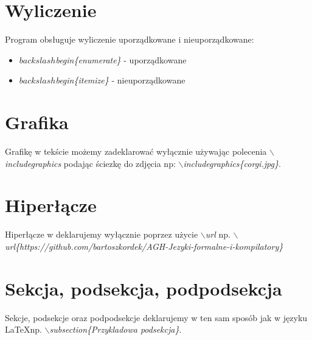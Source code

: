 \section{Wyliczenie}

Program obsługuje wyliczenie uporządkowane i nieuporządkowane:
\begin{itemize}
    \item \textit{$backslash$begin\{enumerate\}} - uporządkowane
    \item \textit{$backslash$begin\{itemize\}} - nieuporządkowane
\end{itemize}

\section{Grafika}
Grafikę w tekście możemy zadeklarować wyłącznie używając polecenia \textit{$\backslash$includegraphics} podając ściezkę do zdjęcia np: 
\textit{$\backslash$includegraphics\{corgi.jpg\}}.

\section{Hiperłącze}

Hiperłącze w deklarujemy wyłącznie poprzez użycie \textit{$\backslash$url} np. \textit{$\backslash$url\{https://github.com/bartoszkordek/AGH-Jezyki-formalne-i-kompilatory\}}

\section{Sekcja, podsekcja, podpodsekcja}
Sekcje, podsekcje oraz podpodsekcje deklarujemy w ten sam sposób jak 
w języku \LaTeX \space np.  \textit{$\backslash$subsection\{Przykladowa podsekcja\}}.


